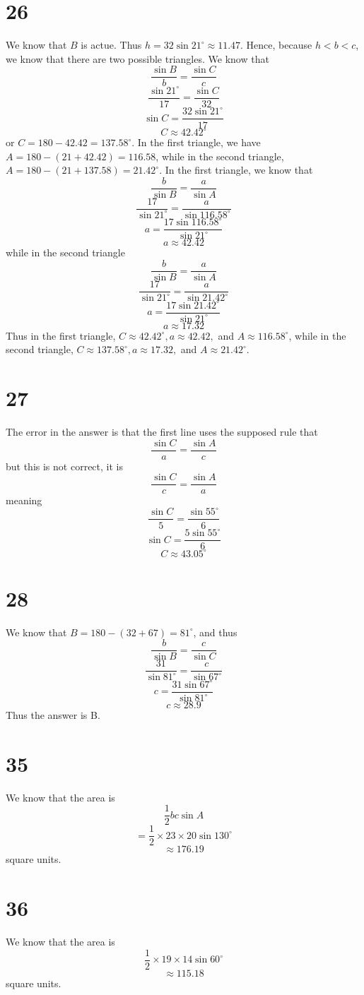 \documentclass{article}
\theoremstyle{definition}
\newcommand{\?}{\stackrel{?}{=}}
\begin{document}
\section*{26}
We know that $B$ is actue. Thus $h=32\sin 21^\circ\approx 11.47$. Hence, because $h<b<c$, we know that there are two possible triangles. We know that
\[ \frac{\sin B}{b}=\frac{\sin C}{c} \]
\[ \frac{\sin 21^\circ}{17}=\frac{\sin C}{32} \]
\[ \sin C=\frac{32\sin 21^\circ}{17} \]
\[ C\approx 42.42^\circ \] or $C=180-42.42=137.58^\circ$. In the first triangle, we have $A=180-(21+42.42)=116.58$, while in the second triangle, 
$A=180-(21+137.58)=21.42^\circ$. In the first triangle, we know that
\[ \frac{b}{\sin B}=\frac{a}{\sin A} \]
\[ \frac{17}{\sin 21^\circ}=\frac{a}{\sin 116.58^\circ} \]
\[ a=\frac{17\sin 116.58^\circ}{\sin 21^\circ} \]
\[ a\approx 42.42 \] while in the second triangle
\[ \frac{b}{\sin B}=\frac{a}{\sin A} \]
\[ \frac{17}{\sin 21^\circ}=\frac{a}{\sin 21.42^\circ} \]
\[ a=\frac{17\sin 21.42^\circ}{\sin 21^\circ} \]
\[ a\approx 17.32 \]
Thus in the first triangle, $C\approx 42.42^\circ,a\approx 42.42,$ and $A\approx 116.58^\circ$, while in the second triangle, 
$C\approx 137.58^\circ,a\approx 17.32,$ and $A\approx 21.42^\circ$.

\section*{27}
The error in the answer is that the first line uses the supposed rule that
\[ \frac{\sin C}{a}=\frac{\sin A}{c} \] but this is not correct, it is
\[ \frac{\sin C}{c}=\frac{\sin A}{a} \] meaning
\[ \frac{\sin C}{5}=\frac{\sin 55^\circ}{6} \]
\[ \sin C=\frac{5\sin 55^\circ}{6} \]
\[ C\approx 43.05^\circ \]

\section*{28}
We know that $B=180-(32+67)=81^\circ$, and thus
\[ \frac{b}{\sin B}=\frac{c}{\sin C} \]
\[ \frac{31}{\sin 81^\circ}=\frac{c}{\sin 67^\circ} \]
\[ c=\frac{31\sin 67^\circ}{\sin 81^\circ} \]
\[ c\approx 28.9 \]
Thus the answer is B.

\section*{35}
We know that the area is
\[ \frac{1}{2}bc\sin A \]
\[ =\frac{1}{2}\times 23\times 20\sin 130^\circ \]
\[ \approx 176.19 \] square units.

\section*{36}
We know that the area is
\[ \frac{1}{2}\times 19\times 14\sin 60^\circ \]
\[ \approx 115.18 \] square units.
\end{document}
